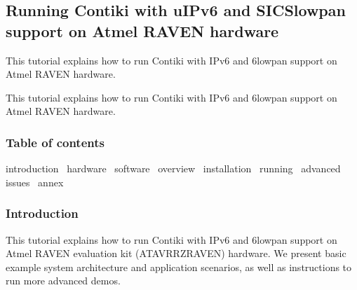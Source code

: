 \hypertarget{a00072}{}\subsection{Running Contiki with u\+I\+Pv6 and S\+I\+C\+Slowpan support on Atmel R\+A\+V\+EN hardware}
\label{a00072}


This tutorial explains how to run Contiki with I\+Pv6 and 6lowpan support on Atmel R\+A\+V\+EN hardware.  


This tutorial explains how to run Contiki with I\+Pv6 and 6lowpan support on Atmel R\+A\+V\+EN hardware. 

\hypertarget{a00072_toc}{}\subsubsection{Table of contents}\label{a00072_toc}
introduction~\newline
 hardware~\newline
 software~\newline
 overview~\newline
 installation~\newline
 running~\newline
 advanced~\newline
 issues~\newline
 annex~\newline




 \hypertarget{a00072_introduction}{}\subsubsection{Introduction}\label{a00072_introduction}
This tutorial explains how to run Contiki with I\+Pv6 and 6lowpan support on Atmel R\+A\+V\+EN evaluation kit (A\+T\+A\+V\+R\+R\+Z\+R\+A\+V\+EN) hardware. We present basic example system architecture and application scenarios, as well as instructions to run more advanced demos.




